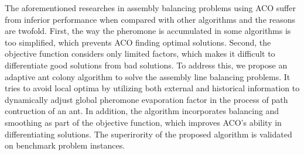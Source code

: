 The aforementioned researches in assembly balancing problems using ACO suffer from inferior performance when compared with other algorithms and the reasons are twofold.
First, the way the pheromone is accumulated in some algorithms is too simplified, which prevents ACO finding optimal solutions.
Second, the objective function considers only limited factors, which makes it difficult to differentiate good solutions from bad solutions.
To address this, we propose an adaptive ant colony algorithm to solve the assembly line balancing problems.
It tries to avoid local optima by utilizing both external and historical information to dynamically adjust global pheromone evaporation factor in the process of path contruction of an ant.
In addition, the algorithm incorporates balancing and smoothing as part of the objective function, which improves ACO's ability in differentiating solutions.
The superirority of the proposed algorithm is validated on benchmark problem instances.
